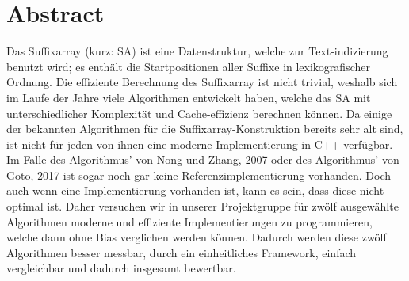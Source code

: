 \chapter*{Abstract}

Das  Suffixarray (kurz: SA) ist eine Datenstruktur, welche zur Text-indizierung benutzt wird; es enthält die Startpositionen aller Suffixe in lexikografischer Ordnung.
Die effiziente Berechnung des Suffixarray ist nicht trivial, weshalb sich im Laufe der Jahre viele Algorithmen entwickelt haben, welche das SA mit unterschiedlicher Komplexität und Cache-effizienz berechnen können.
Da einige der bekannten Algorithmen für die Suffixarray-Konstruktion bereits sehr alt sind, ist nicht für jeden von ihnen eine moderne Implementierung in C++ verfügbar.
Im Falle des Algorithmus' von Nong und Zhang, 2007 oder des Algorithmus' von Goto, 2017 ist sogar noch gar keine Referenzimplementierung vorhanden.
Doch auch wenn eine Implementierung vorhanden ist, kann es sein, dass diese nicht optimal ist.
Daher versuchen wir in unserer Projektgruppe für zwölf ausgewählte Algorithmen moderne und effiziente Implementierungen zu programmieren, welche dann ohne Bias verglichen werden können.
Dadurch werden diese zwölf Algorithmen besser messbar, durch ein einheitliches Framework, einfach vergleichbar und dadurch insgesamt bewertbar.

